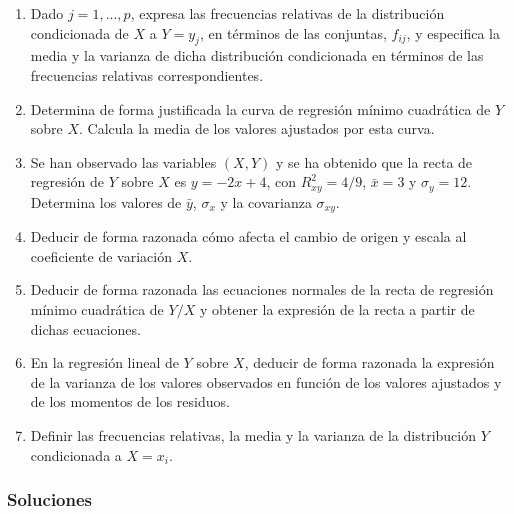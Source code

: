 \documentclass[fleqn]{article}
\begin{document}
\begin{enumerate}
                        \begin{enumerate}
                                \item Dado $j = 1,..., p$, expresa las frecuencias relativas de la distribución condicionada de $X$ a $Y = y_j$,
                                        en términos de las conjuntas, $f_{ij}$, y especifica la media y la varianza de dicha distribución 
                                        condicionada en términos de las frecuencias relativas correspondientes.
                                \item Determina de forma justificada la curva de regresión mínimo cuadrática de $Y$ sobre $X$. Calcula la 
                                        media de los valores ajustados por esta curva.
                                \item Se han observado las variables $(X, Y)$ y se ha obtenido que la recta de regresión de $Y$ sobre $X$ es
                                        $y = -2x + 4$, con $R^2_{xy} = 4/9$, $\bar{x} = 3$ y $\sigma_y = 12$. Determina los valores de $\bar{y}$, 
                                        $\sigma_x$ y la covarianza $\sigma_{xy}$.
                                \item Deducir de forma razonada cómo afecta el cambio de origen y escala al coeficiente de variación $X$.
                                \item Deducir de forma razonada las ecuaciones normales de la recta de regresión mínimo cuadrática de $Y/X$
                                        y obtener la expresión de la recta a partir de dichas ecuaciones. 
                                \item En la regresión lineal de $Y$ sobre $X$, deducir de forma razonada la expresión de la varianza de los 
                                        valores observados en función de los valores ajustados y de los momentos de los residuos. 
                                \item Definir las frecuencias relativas, la media y la varianza de la distribución $Y$ condicionada a $X = x_i$.
                        \end{enumerate}

        
                \newpage

                \subsubsection{Soluciones}


\end{enumerate}
\end{document}
